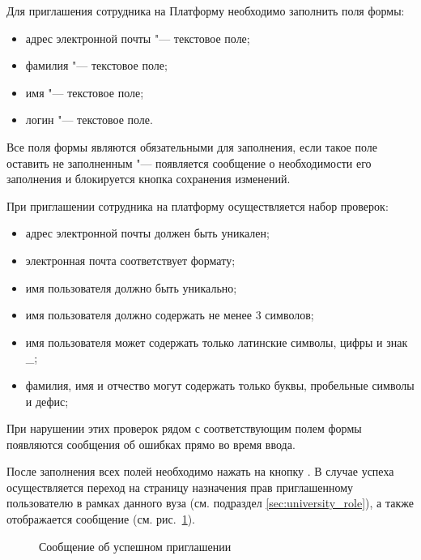 Для приглашения сотрудника на Платформу необходимо заполнить поля формы:
\begin{itemize}
	\item адрес электронной почты "--- текстовое поле;
	\item фамилия "--- текстовое поле;
	\item имя "--- текстовое поле;
	\item логин "--- текстовое поле.
\end{itemize}

Все поля формы являются обязательными для заполнения, если такое поле оставить не заполненным "--- появляется сообщение 
о необходимости его заполнения и блокируется кнопка сохранения изменений. 

При приглашении сотрудника на платформу осуществляется набор проверок:
\begin{itemize}
	\item адрес электронной почты должен быть уникален;
	\item электронная почта соответствует формату;
	\item имя пользователя должно быть уникально;
	\item имя пользователя должно содержать не менее 3 символов;
	\item имя пользователя может содержать только латинские символы, цифры и знак \_;
	\item фамилия, имя и отчество могут содержать только буквы, пробельные символы и дефис;
\end{itemize}

При нарушении этих проверок рядом с соответствующим полем формы появляются сообщения об ошибках прямо во время ввода.

После заполнения всех полей необходимо нажать на кнопку .
В случае успеха осуществляется переход на страницу назначения прав приглашенному пользователю в рамках данного вуза 
(см. подраздел \ref{sec:university_role}), а также отображается сообщение (см. рис.~\ref{img:employee:invite_message}).

\begin{figure}[H]
	\caption{Сообщение об успешном приглашении}
	\label{img:employee:invite_message}
\end{figure}


